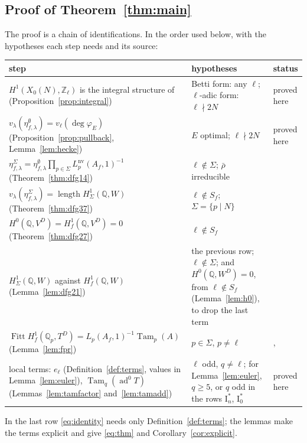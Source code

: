 \documentclass[11pt]{amsart}
\theoremstyle{definition}
\newcommand{\Q}{\mathbb{Q}}
\newcommand{\Z}{\mathbb{Z}}
\newcommand{\degphi}{\deg\varphi_E}
\newcommand{\ad}{\operatorname{ad}^0}
\newcommand{\nv}{\mathrm{nv}}
\newcommand{\Fitt}{\operatorname{Fitt}}
\newcommand{\Tam}{\operatorname{Tam}}
\newcommand{\len}{\operatorname{length}}
\begin{document}
\subsection{Proof of Theorem~\ref{thm:main}}
The proof is a chain of identifications. In the order used below, with the hypotheses each step needs and its source:
\begin{center}\footnotesize
\begin{tabular}{@{}>{\raggedright\arraybackslash}p{}>{\raggedright\arraybackslash}p{}>{\raggedright\arraybackslash}p{}@{}}
\toprule
step & hypotheses & status\\
\midrule
$H^1(X_0(N),\Z_\ell)$ is the integral structure of \cite{DFG04} (Proposition~\ref{prop:integral}) & Betti form: any $\ell$; $\ell$-adic form: $\ell\nmid2N$ & proved here\\
$v_\lambda(\eta^\emptyset_{f,\lambda})=v_\ell(\degphi)$ (Proposition~\ref{prop:pullback}, Lemma~\ref{lem:hecke}) & $E$ optimal; $\ell\nmid2N$ & proved here\\
$\eta^\Sigma_{f,\lambda}=\eta^\emptyset_{f,\lambda}\prod_{p\in\Sigma}L_p^{\nv}(A_f,1)^{-1}$ (Theorem~\ref{thm:dfg14}) & $\ell\notin\Sigma$; $\bar\rho$ irreducible & \cite[Proposition 1.4(c)]{DFG04}\\
$v_\lambda(\eta^\Sigma_{f,\lambda})=\len H^1_\Sigma(\Q,W)$ (Theorem~\ref{thm:dfg37}) & $\ell\notin S_f$; $\Sigma=\{p\mid N\}$ & \cite[Theorem 3.7]{DFG04}\\
$H^0(\Q,V^D)=H^1_f(\Q,V^D)=0$ (Theorem~\ref{thm:dfg27}) & $\ell\notin S_f$ & \cite[Theorem 2.7]{DFG04}\\
$H^1_\Sigma(\Q,W)$ against $H^1_f(\Q,W)$ (Lemma~\ref{lem:dfg21}) & the previous row; $\ell\notin\Sigma$; and $H^0(\Q,W^D)=0$, from $\ell\notin S_f$ (Lemma~\ref{lem:h0}), to drop the last term & \cite[Lemma 2.1]{DFG04}\\
$\Fitt H^1_f(\Q_p,T^D)=L_p(A_f,1)^{-1}\Tam_p(A)$ (Lemma~\ref{lem:fpr}) & $p\in\Sigma$, $p\ne\ell$ & \cite[I.4.2.2]{FPR94}, \cite[(57)]{DFG04}\\
local terms: $e_\ell$ (Definition~\ref{def:terms}, values in Lemma~\ref{lem:euler}), $\Tam_q(\ad T)$ (Lemmas~\ref{lem:tamfactor} and~\ref{lem:tamadd}) & $\ell$ odd, $q\ne\ell$; for Lemma~\ref{lem:euler}, $q\ge5$, or $q$ odd in the rows $\mathrm{I}_n^*$, $\mathrm{I}_0^*$ & proved here\\
\bottomrule
\end{tabular}
\end{center}
In the last row \eqref{eq:identity} needs only Definition~\ref{def:terms}; the lemmas make the terms explicit and give \eqref{eq:thm} and Corollary~\ref{cor:explicit}.
\end{document}
